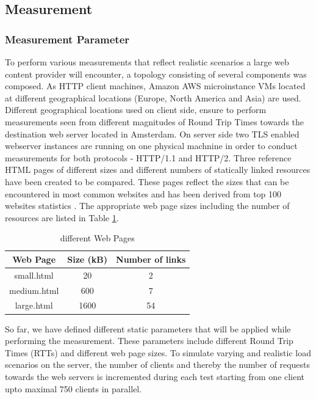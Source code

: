 \subsection{Measurement}
\subsubsection{Measurement Parameter}
\label{subsec:measurements}
To perform various measurements that reflect realistic scenarios a large web content provider will encounter, a topology consisting of several components was composed. As HTTP client machines, Amazon AWS microinstance VMs \cite{amazon} located at different geographical locations (Europe, North America and Asia) are used. Different geographical locations used on client side, ensure to perform measurements seen from different magnitudes of Round Trip Times towards the destination web server located in Amsterdam. On server side two TLS enabled webserver instances are running on one physical machnine in order to conduct measurements for both protocols - HTTP/1.1 and HTTP/2. Three reference HTML pages of different sizes and different numbers of statically linked resources have been created to be compared. These pages reflect the sizes that can be encountered in most common websites and has been derived from top 100 websites statistics \cite{httparchive}. The appropriate web page sizes including the number of resources are listed in Table \ref{table:pages}.

\begin{table}[h]
	\centering
\begin{tabular}{ | c | c | c | }
\hline
\textbf{Web Page} & \textbf{Size (kB)} & \textbf{Number of links}\\ \hline \hline
small.html &  20 & 2 \\ \hline
medium.html &  600 & 7\\ \hline 
large.html &  1600 & 54 \\
\hline
\end{tabular}
\caption{different Web Pages}
\label{table:pages}
\end{table}

So far, we have defined different static parameters that will be applied while performing the measurement. These parameters include different Round Trip Times (RTTs) and different web page sizes.  
To simulate varying and realistic load scenarios on the server, the number of clients and thereby the number of requests towards the web servers is incremented during each test starting from one client upto maximal 750 clients in parallel.
\\  
